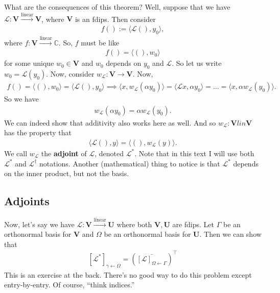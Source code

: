 \documentclass{article}
\theoremstyle{definition}
\newcommand{\C}{\mathbb{C}}
\newcommand{\V}{\mathbf{V}}
\newcommand{\U}{\mathbf{U}}
\newcommand{\lag}{\mathcal{L}}
\newcommand{\lin}{\overset{\text{linear}}{\longrightarrow}}
\newcommand{\la}{\langle}
\newcommand{\ra}{\rangle}
\newcommand{\lp}{\left(}
\newcommand{\rp}{\right)}
\begin{document}
What are the consequences of this theorem? Well, suppose that  we have $\lag : \V \lin \V$, where $\V$ is an fdips. Then consider
\begin{align*}
f() := \la \lag(), y_0 \ra,
\end{align*}
where $f:\V \lin \C$. So, $f$ must be like 
\begin{align*}
f() = \la (),w_0 \ra
\end{align*}
for some unique $w_0 \in \V$ and $w_0$ depends on $y_0$ and $\lag$. So let us write $w_0 = \lag(y_0)$. Now, consider $w_\lag : \V \to \V$. Now,
\begin{align*}
f() = \la (),w_0 \ra = \la \lag(), y_0\ra \implies \la x,w_\lag(\alpha y_0) \ra = \la \lag x, \alpha y_0 \ra = \dots = \la x,\alpha w_\lag(y_0) \ra.
\end{align*}
So we have
\begin{align*}
w_\lag(\alpha y_0) = \alpha w_\lag(y_0).
\end{align*}
We can indeed show that additivity also works here as well. And so $w_\lag : \V lin \V$ has the property that 
\begin{align*}
\la \lag(), y\ra = \la (), w_\lag(y) \ra.
\end{align*}
We call $w_\lag$ the \textbf{adjoint} of $\lag$, denoted $\lag^*$. Note that in this text I will use both $\lag^*$ and $\lag^\dagger$ notations. Another (mathematical) thing to notice is that $\lag^*$ depends on the inner product, but not the basis. 














\subsection{Adjoints}




Now, let's say we have $\lag : \V \lin \U$ where both $\V,\U$ are fdips. Let $\Gamma$ be an orthonormal basis for $\V$ and $\Omega$ be an orthonormal basis for $\U$. Then we can show that
\begin{align*}
\boxed{[\lag^*]_{\gamma\leftarrow\Omega} = \lp \bar{[\lag]_{\Omega\leftarrow\Gamma}} \rp^\top}
\end{align*}
This is an exercise at the back. There's no good way to do this problem except entry-by-entry. Of course, ``think indices.''
\end{document}
